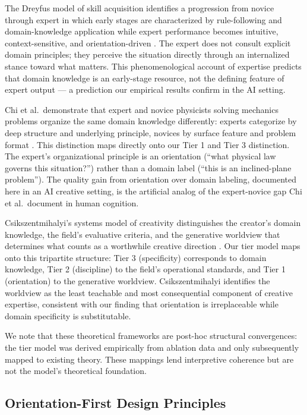 The Dreyfus model of skill acquisition identifies a progression from novice through
expert in which early stages are characterized by rule-following and domain-knowledge
application while expert performance becomes intuitive, context-sensitive, and
orientation-driven \cite{dreyfus1980mind}. The expert does not consult explicit
domain principles; they perceive the situation directly through an internalized
stance toward what matters. This phenomenological account of expertise predicts that
domain knowledge is an early-stage resource, not the defining feature of expert
output --- a prediction our empirical results confirm in the AI setting.

Chi et al.\ demonstrate that expert and novice physicists solving mechanics problems
organize the same domain knowledge differently: experts categorize by deep structure
and underlying principle, novices by surface feature and problem format
\cite{chi1981categorization}. This distinction maps directly onto our Tier 1 and Tier
3 distinction. The expert's organizational principle is an orientation (``what physical
law governs this situation?'') rather than a domain label (``this is an inclined-plane
problem''). The quality gain from orientation over domain labeling, documented here in
an AI creative setting, is the artificial analog of the expert-novice gap Chi et al.\
document in human cognition.

Csikszentmihalyi's systems model of creativity distinguishes the creator's domain
knowledge, the field's evaluative criteria, and the generative worldview that
determines what counts as a worthwhile creative direction \cite{csikszentmihalyi1997creativity}.
Our tier model maps onto this tripartite structure: Tier 3 (specificity) corresponds
to domain knowledge, Tier 2 (discipline) to the field's operational standards, and
Tier 1 (orientation) to the generative worldview. Csikszentmihalyi identifies the
worldview as the least teachable and most consequential component of creative
expertise, consistent with our finding that orientation is irreplaceable while domain
specificity is substitutable.

We note that these theoretical frameworks are post-hoc structural convergences: the tier
model was derived empirically from ablation data and only subsequently mapped to existing
theory. These mappings lend interpretive coherence but are not the model's theoretical
foundation.

\subsection{Orientation-First Design Principles}

